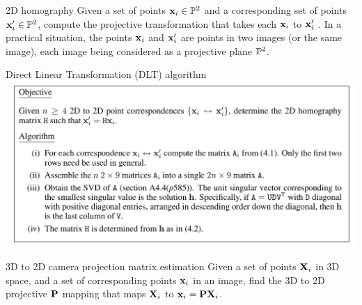 \documentclass[times,t]{beamer}
\begin{document}
\begin{frame}{2D homography}
Given a set of points $\mathbf{x}_i \in \mathbb{P}^2$ and a corresponding set of
points $\mathbf{x}'_i \in \mathbb{P}^2$, compute the projective transformation that takes each
$\mathbf{x}_i$ to $\mathbf{x}'_i$ . In a practical situation, the points $\mathbf{x}_i$ and   $\mathbf{x}'_i$  are points in two images
(or the same image), each image being considered as a projective plane  $\mathbb{P}^2$.
\end{frame}

\begin{frame}{Direct Linear Transformation   (DLT) algorithm}
  \includegraphics[width=\linewidth]{media/DLT-algorithm.png}
\end{frame}

\begin{frame}{3D  to  2D camera projection matrix estimation}
  Given a set of points $\mathbf{X}_i$ in 3D space, and a set
  of corresponding points $\mathbf{x}_i$ in an image, find the 3D to 2D projective
  $\mathbf{P}$ mapping
  that maps $\mathbf{X}_i$ to $\mathbf{x}_i  =  \mathbf{P}\mathbf{X}_i$.
  \end{frame}
\end{document}
